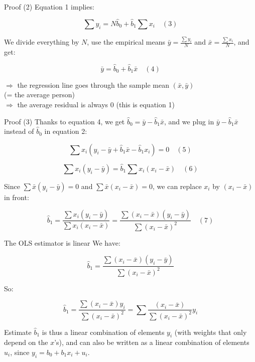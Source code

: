 \documentclass[aspectratio=169]{beamer}
\begin{document}
\begin{frame}{Proof (2)}
Equation 1 implies:

\[\sum y_i = N\hat{b}_0 + \hat{b}_1 \sum x_i \quad (3)\]

We divide everything by $N$, use the empirical means $\bar{y} = \frac{\sum y_i}{N}$ and $\bar{x} = \frac{\sum x_i}{N}$, and get:

\[\bar{y} = \hat{b}_0 + \hat{b}_1\bar{x} \quad (4)\]

$\Rightarrow$ the regression line goes through the sample mean $(\bar{x}, \bar{y})$\\
(= the average person)\\
$\Rightarrow$ the average residual is always 0 (this is equation 1)
\end{frame}

\begin{frame}{Proof (3)}
Thanks to equation 4, we get $\hat{b}_0 = \bar{y} - \hat{b}_1\bar{x}$, and we plug in $\bar{y} - \hat{b}_1\bar{x}$ instead of $\hat{b}_0$ in equation 2:

\[\sum x_i(y_i - \bar{y} + \hat{b}_1\bar{x} - \hat{b}_1x_i) = 0 \quad (5)\]

\[\sum x_i(y_i - \bar{y}) = \hat{b}_1 \sum x_i(x_i - \bar{x}) \quad (6)\]

Since $\sum \bar{x}(y_i - \bar{y}) = 0$ and $\sum \bar{x}(x_i - \bar{x}) = 0$, we can replace $x_i$ by $(x_i - \bar{x})$ in front:

\[\hat{b}_1 = \frac{\sum x_i(y_i - \bar{y})}{\sum x_i(x_i - \bar{x})} = \frac{\sum(x_i - \bar{x})(y_i - \bar{y})}{\sum(x_i - \bar{x})^2} \quad (7)\]
\end{frame}

\begin{frame}{The OLS estimator is linear}
We have:

\[\hat{b}_1 = \frac{\sum(x_i - \bar{x})(y_i - \bar{y})}{\sum(x_i - \bar{x})^2}\]

So:

\[\hat{b}_1 = \frac{\sum(x_i - \bar{x})y_i}{\sum(x_i - \bar{x})^2} = \sum \frac{(x_i - \bar{x})}{\sum(x_i - \bar{x})^2}y_i\]

Estimate $\hat{b}_1$ is thus a linear combination of elements $y_i$ (with weights that only depend on the $x$'s), and can also be written as a linear combination of elements $u_i$, since $y_i = b_0 + b_1x_i + u_i$.
\end{frame}
\end{document}
